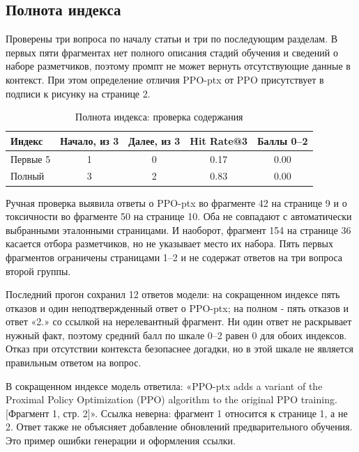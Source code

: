 \documentclass[12pt,a4paper]{article}
\begin{document}
\subsection{Полнота индекса}
Проверены три вопроса по началу статьи и три по последующим разделам. В первых пяти фрагментах нет полного описания стадий обучения и сведений о наборе разметчиков, поэтому промпт не может вернуть отсутствующие данные в контекст. При этом определение отличия PPO-ptx от PPO присутствует в подписи к рисунку на странице 2.
\begin{table}[H]\centering\caption{Полнота индекса: проверка содержания}\begin{tabular}{lcccc}\toprule Индекс&Начало, из 3&Далее, из 3&Hit Rate@3&Баллы 0--2\\\midrule Первые 5&1&0&0.17&0.00\\ Полный&3&2&0.83&0.00\\\bottomrule\end{tabular}\end{table}
Ручная проверка выявила ответы о PPO-ptx во фрагменте 42 на странице 9 и о токсичности во фрагменте 50 на странице 10. Оба не совпадают с автоматически выбранными эталонными страницами. И наоборот, фрагмент 154 на странице 36 касается отбора разметчиков, но не указывает место их набора. Пять первых фрагментов ограничены страницами 1--2 и не содержат ответов на три вопроса второй группы.

Последний прогон сохранил 12 ответов модели: на сокращенном индексе пять отказов и один неподтвержденный ответ о PPO-ptx; на полном - пять отказов и ответ «2.» со ссылкой на нерелевантный фрагмент. Ни один ответ не раскрывает нужный факт, поэтому средний балл по шкале 0--2 равен 0 для обоих индексов. Отказ при отсутствии контекста безопаснее догадки, но в этой шкале не является правильным ответом на вопрос.

В сокращенном индексе модель ответила: «PPO-ptx adds a variant of the Proximal Policy Optimization (PPO) algorithm to the original PPO training. [Фрагмент 1, стр. 2]». Ссылка неверна: фрагмент 1 относится к странице 1, а не 2. Ответ также не объясняет добавление обновлений предварительного обучения. Это пример ошибки генерации и оформления ссылки.
\end{document}
